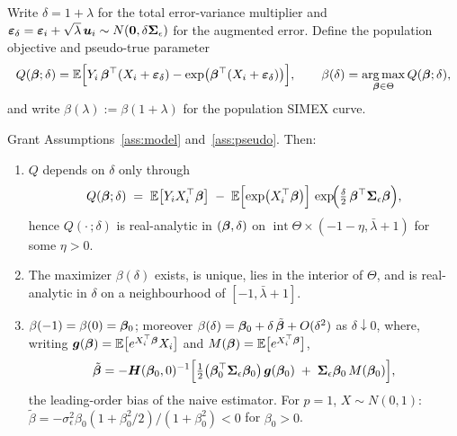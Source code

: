 Write $\delta=1+\lambda$ for the total error-variance multiplier and
$\bm{\varepsilon}_\delta=\bm{\varepsilon}_i+\sqrt\lambda\,\bm{u}_i\sim N(\bm 0,
\delta\bm{\Sigma}_\epsilon)$ for the augmented error. Define the population
objective and pseudo-true parameter
\begin{equation}\label{eq:popobj}
  Q(\bm{\beta};\delta)
  =\mathbb{E}\Bigl[Y_i\,\bm{\beta}^\top(X_i+\bm{\varepsilon}_\delta)
      -\exp\bigl(\bm{\beta}^\top(X_i+\bm{\varepsilon}_\delta)\bigr)\Bigr],
  \qquad
  \beta(\delta)=\operatorname*{arg\,max}_{\bm{\beta}\in\Theta}Q(\bm{\beta};\delta),
\end{equation}
and write $\beta(\lambda):=\beta(1+\lambda)$ for the population SIMEX
curve.

\begin{lemma}\label{lem:curve}
Grant Assumptions~\ref{ass:model} and~\ref{ass:pseudo}. Then:
\begin{enumerate}\itemsep2pt
\item[(i)] $Q$ depends on $\delta$ only through
      \[
        Q(\bm{\beta};\delta)\;=\;\mathbb{E}\bigl[Y_iX_i^\top\bm{\beta}\bigr]
        \;-\;\mathbb{E}\Bigl[\exp\bigl(X_i^\top\bm{\beta}\bigr)\Bigr]\,
        \exp\!\Bigl(\tfrac{\delta}{2}\,\bm{\beta}^\top\bm{\Sigma}_\epsilon\bm{\beta}\Bigr),
      \]
      hence $Q(\cdot\,;\delta)$ is real-analytic in
      $(\bm{\beta},\delta)$ on
      $\operatorname{int}\Theta\times(-1-\eta,\bar\lambda+1)$ for some
      $\eta>0$.
\item[(ii)] The maximizer $\beta(\delta)$ exists, is unique, lies in
      the interior of $\Theta$, and is real-analytic in $\delta$ on a
      neighbourhood of $[-1,\bar\lambda+1]$.
\item[(iii)] $\beta(-1)=\beta(0)=\bm{\beta}_0$; moreover
      $\beta(\delta)=\bm{\beta}_0+\delta\,\tilde{\bm{\beta}}+O(\delta^2)$ as
      $\delta\downarrow0$, where, writing
      $\bm g(\bm{\beta})=\mathbb{E}\bigl[e^{X_i^\top\bm{\beta}}X_i\bigr]$ and
      $M(\bm{\beta})=\mathbb{E}\bigl[e^{X_i^\top\bm{\beta}}\bigr]$,
      \begin{equation}\label{eq:bias1}
        \tilde{\bm{\beta}}
        =-\bm{H}(\bm{\beta}_0,0)^{-1}\Bigl[
          \tfrac12\bigl(\bm{\beta}_0^\top\bm{\Sigma}_\epsilon\bm{\beta}_0\bigr)\,
          \bm g(\bm{\beta}_0)\;+\;\bm{\Sigma}_\epsilon\bm{\beta}_0\,M(\bm{\beta}_0)
        \Bigr],
      \end{equation}
      the leading-order bias of the naive estimator. For $p=1$,
      $X\sim N(0,1)$:
      $\tilde\beta=-\sigma^2_\epsilon\beta_0
      (1+\beta_0^2/2)/(1+\beta_0^2)<0$ for $\beta_0>0$.
\end{enumerate}
\end{lemma}

